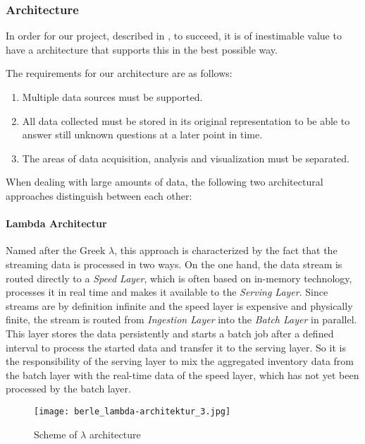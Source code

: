 \subsubsection{Architecture}
\label{subsubsec:architecture}
In order for our project, described in , to succeed, it is of inestimable value to have a
architecture that supports this in the best possible way.

The requirements for our architecture are as follows:
\begin{enumerate}
  \item Multiple data sources must be supported.
  \item All data collected must be stored in its original representation to be able to answer still unknown questions at a later point in time.
  \item The areas of data acquisition, analysis and visualization must be separated.
\end{enumerate}

When dealing with large amounts of data, the following two architectural approaches distinguish between each other:

\paragraph{Lambda Architectur}
Named after the Greek $\lambda$, this approach is characterized by the fact that the streaming data is processed in two ways.
On the one hand, the data stream is routed directly to a \textit{Speed Layer}, which is often based on in-memory technology,
processes it in real time and makes it available to the \textit{Serving Layer}.
Since streams are by definition infinite and the speed layer is expensive and physically finite,
the stream is routed from \textit{Ingestion Layer} into the \textit{Batch Layer} in parallel.
This layer stores the data persistently and starts a batch job after a defined interval to process the started data and transfer it to the serving layer.
So it is the responsibility of the serving layer to mix the aggregated inventory data from the batch layer with the real-time data of the speed layer,
which has not yet been processed by the batch layer.\cite{lambda} \cite{jaxkappa}

\begin{figure}[h]
	\centering
	\texttt{[image: berle\_lambda-architektur\_3.jpg]}
	\caption[Scheme of $\lambda$ architecture]{Scheme of $\lambda$ architecture\cite{jaxkappa}}
	\label{fig:KafkaArchitecture}
\end{figure}

